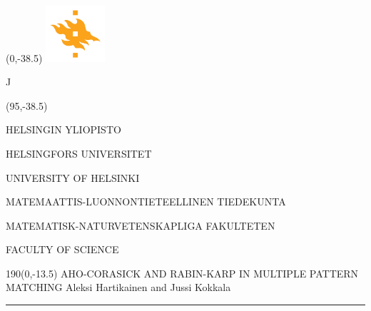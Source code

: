 \documentclass[a4paper]{article} %
\begin{document}
\pagestyle{empty} %




\begin{textblock}{95}(0,-38.5)
\includegraphics[width=22mm]{flame}
\end{textblock}	

J\begin{textblock}{95}(95,-38.5)
{\fontsize{8}{7}\selectfont\sffamily\color{unigray}
\hfill HELSINGIN YLIOPISTO

\hfill HELSINGFORS UNIVERSITET

\hfill UNIVERSITY OF HELSINKI

\color{sciorange}\hfill MATEMAATTIS-LUONNONTIETEELLINEN TIEDEKUNTA

\hfill MATEMATISK-NATURVETENSKAPLIGA FAKULTETEN

\hfill FACULTY OF SCIENCE %


}
\end{textblock}


\begin{textblock}{190}(0,-13.5)
{\sffamily\LARGE{{\color{sciorange}AHO-CORASICK \color{unigray}AND RABIN-KARP IN MULTIPLE PATTERN MATCHING}}}
\small\hfill Aleksi Hartikainen and Jussi Kokkala\\ %
\rule[2mm]{190mm}{0.3pt} %
\end{textblock}
\end{document}
